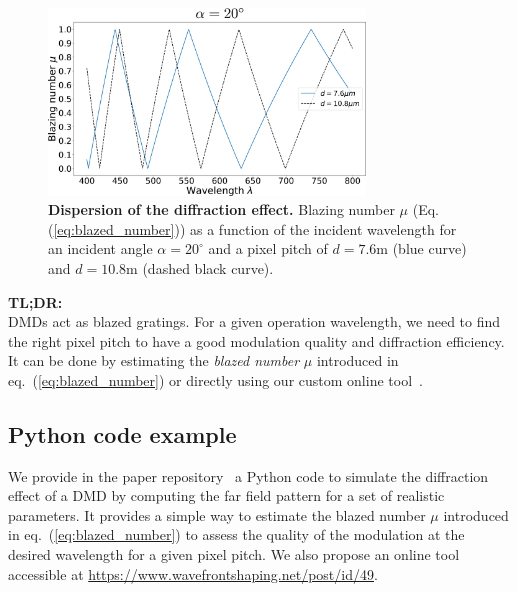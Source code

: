 \documentclass[12pt]{iopart}
\begin{document}
\begin{figure}[ht]
  \centering
  \includegraphics[width = 0.75\textwidth]{images/blazing_number_VS_wavelength.pdf}
  \caption{
    \textbf{Dispersion of the diffraction effect.}
    Blazing number $\mu$ (Eq.(\ref{eq:blazed_number})) as a function of the incident wavelength
    for an incident angle $\alpha = 20^\circ$
    and a pixel pitch of $d=7.6$\textmu m (blue curve)
    and $d=10.8$\textmu m (dashed black curve).
  }
  \label{fig:dispersion}
\end{figure}



\begin{tldr}
  \textbf{TL;DR:}\\
  DMDs act as blazed gratings.
  For a given operation wavelength,
  we need to find the right pixel pitch
  to have a good modulation quality
  and diffraction efficiency.
  It can be done by estimating the \textit{blazed number} $\mu$ introduced in eq.~(\ref{eq:blazed_number})
  or directly using our custom online tool~\cite{popoffDMDDiffractionTool}.
\end{tldr}


\subsection{Python code example}

We provide in the paper repository~\cite{github} a Python code
to simulate the diffraction effect of a DMD
by computing the far field pattern for a set of realistic parameters.
It provides a simple way to estimate the blazed number $\mu$ introduced in eq.~(\ref{eq:blazed_number})
to assess the quality of the modulation at the desired wavelength
for a given pixel pitch.
We also propose an online tool accessible at
\url{https://www.wavefrontshaping.net/post/id/49}.




\end{document}
